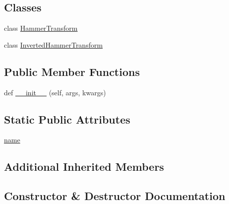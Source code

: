 \subsection*{Classes}
\begin{DoxyCompactItemize}
\item 
class \hyperlink{classmatplotlib_1_1projections_1_1geo_1_1HammerAxes_1_1HammerTransform}{Hammer\+Transform}
\item 
class \hyperlink{classmatplotlib_1_1projections_1_1geo_1_1HammerAxes_1_1InvertedHammerTransform}{Inverted\+Hammer\+Transform}
\end{DoxyCompactItemize}
\subsection*{Public Member Functions}
\begin{DoxyCompactItemize}
\item 
def \hyperlink{classmatplotlib_1_1projections_1_1geo_1_1HammerAxes_a85a8629102264810fc0cb90af935dcc1}{\+\_\+\+\_\+init\+\_\+\+\_\+} (self, args, kwargs)
\end{DoxyCompactItemize}
\subsection*{Static Public Attributes}
\begin{DoxyCompactItemize}
\item 
\hyperlink{classmatplotlib_1_1projections_1_1geo_1_1HammerAxes_a2542a133597f433f01f8a3e935a524b2}{name}
\end{DoxyCompactItemize}
\subsection*{Additional Inherited Members}


\subsection{Constructor \& Destructor Documentation}
\mbox{\label{classmatplotlib_1_1projections_1_1geo_1_1HammerAxes_a85a8629102264810fc0cb90af935dcc1}} 
